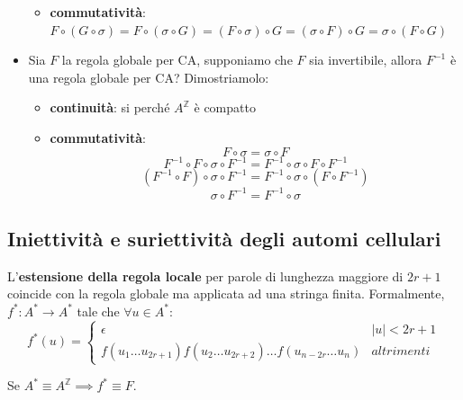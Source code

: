 \begin{itemize}
\begin{itemize}
              \item \textbf{commutatività}: $F\circ (G\circ \sigma) = F\circ (\sigma\circ G) = (F\circ \sigma)\circ G =(\sigma\circ F)\circ G = \sigma\circ (F\circ G)$
          \end{itemize}
    \item Sia $F$ la regola globale per CA, supponiamo che $F$ sia invertibile,
          allora $F^{-1}$ è una regola globale per CA? Dimostriamolo:
          \begin{itemize}
              \item \textbf{continuità}: si perché $A^\mathbb{Z}$ è compatto
              \item \textbf{commutatività}: $$F\circ \sigma = \sigma \circ F $$
                    $$ F^{-1} \circ F\circ \sigma \circ F^{-1}= F^{-1}\circ \sigma \circ F \circ F^{-1}$$
                    $$ (F^{-1} \circ F)\circ \sigma \circ F^{-1}= F^{-1}\circ \sigma \circ (F \circ F^{-1})$$
                    $$ \sigma \circ F^{-1}= F^{-1}\circ \sigma$$
          \end{itemize}
\end{itemize}

\subsection{Iniettività e suriettività degli automi cellulari}

\begin{definizione} 
    L'\textbf{estensione della regola locale} per parole di lunghezza maggiore di
    $2r+1$ coincide con la regola globale ma
    applicata ad una stringa finita. Formalmente, $f^\ast: A^\ast\rightarrow A^\ast$
    tale che $\forall u\in A^\ast$:
    \begin{equation*}
        f^\ast(u) = \begin{cases}
            \epsilon                                                             & |u| < 2r+1 \\
            f(u_1\dots u_{2r+1})f(u_2\dots u_{2r+2})\dots f(u_{n-2r}\dots u_{n}) & altrimenti
        \end{cases}
    \end{equation*}
\end{definizione}

\begin{nota}
    Se $A^\ast\equiv A^\mathbb{Z}\implies f^\ast \equiv F$.
\end{nota}

